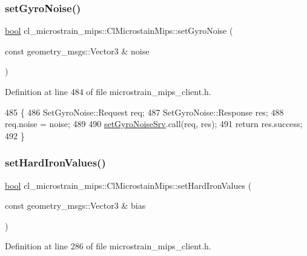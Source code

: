 \subsubsection{\texorpdfstring{set\+Gyro\+Noise()}{setGyroNoise()}}
{\footnotesize\ttfamily \hyperlink{classbool}{bool} cl\+\_\+microstrain\+\_\+mips\+::\+Cl\+Microstain\+Mips\+::set\+Gyro\+Noise (\begin{DoxyParamCaption}\item[{const geometry\+\_\+msgs\+::\+Vector3 \&}]{noise }\end{DoxyParamCaption})\hspace{0.3cm}{\ttfamily [inline]}}



Definition at line 484 of file microstrain\+\_\+mips\+\_\+client.\+h.


\begin{DoxyCode}
485     \{
486         SetGyroNoise::Request req;
487         SetGyroNoise::Response res;
488         req.noise = noise;
489 
490         \hyperlink{classcl__microstrain__mips_1_1ClMicrostainMips_a712c389ca54fa2ebe89ffd601b03bd37}{setGyroNoiseSrv}.call(req, res);
491         \textcolor{keywordflow}{return} res.success;
492     \}
\end{DoxyCode}
\mbox{\label{classcl__microstrain__mips_1_1ClMicrostainMips_a6f9ae5ca80db4a93db8b01192d38b426}} 
\subsubsection{\texorpdfstring{set\+Hard\+Iron\+Values()}{setHardIronValues()}}
{\footnotesize\ttfamily \hyperlink{classbool}{bool} cl\+\_\+microstrain\+\_\+mips\+::\+Cl\+Microstain\+Mips\+::set\+Hard\+Iron\+Values (\begin{DoxyParamCaption}\item[{const geometry\+\_\+msgs\+::\+Vector3 \&}]{bias }\end{DoxyParamCaption})\hspace{0.3cm}{\ttfamily [inline]}}



Definition at line 286 of file microstrain\+\_\+mips\+\_\+client.\+h.


